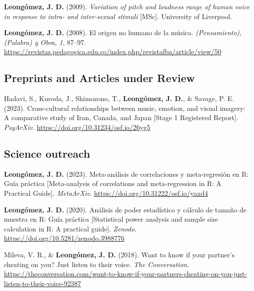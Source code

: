 \documentclass[11pt,a4paper,]{awesome-cv}
\begin{document}
\textbf{Leongómez, J. D.} (2009). \emph{Variation of pitch and loudness
range of human voice in response to intra- and inter-sexual stimuli}
{[}MSc{]}. University of Liverpool.

\textbf{Leongómez, J. D.} (2008). El origen no humano de la música.
\emph{(Pensamiento), (Palabra) y Obra, 1}, 87--97.
\url{https://revistas.pedagogica.edu.co/index.php/revistafba/article/view/50}

\endgroup

\hypertarget{section-1}{%
\subsection{\texorpdfstring{\textbf{Preprints and Articles under Review}}{}}\label{section-1}}

\begingroup
\footnotesize
\setlength{\parindent}{-0.5in}
\setlength{\leftskip}{0.5in}

Hadavi, S., Kuroda, J., Shimozono, T., \textbf{Leongómez, J. D.}, \&
Savage, P. E. (2023). Cross-cultural relationships between music,
emotion, and visual imagery: A comparative study of Iran, Canada, and
Japan {[}Stage 1 Registered Report{]}. \emph{PsyArXiv}.
\url{https://doi.org/10.31234/osf.io/26yg5}

\endgroup

\hypertarget{section-2}{%
\subsection{\texorpdfstring{\textbf{Science outreach}}{}}\label{section-2}}

\begingroup
\footnotesize
\setlength{\parindent}{-0.5in}
\setlength{\leftskip}{0.5in}

\textbf{Leongómez, J. D.} (2023). Meta-análisis de correlaciones y
meta-regresión en R: Guía práctica {[}Meta-analysis of correlations and
meta-regression in R: A Practical Guide{]}. \emph{MetaArXiv}.
\url{https://doi.org/10.31222/osf.io/yaxd4}

\textbf{Leongómez, J. D.} (2020). Análisis de poder estadístico y
cálculo de tamaño de muestra en R: Guía práctica {[}Statistical power
analysis and sample size calculation in R: A practical guide{]}.
\emph{Zenodo}. \url{https://doi.org/10.5281/zenodo.3988776}

Mileva, V. R., \& \textbf{Leongómez, J. D.} (2018). Want to know if your
partner's cheating on you? Just listen to their voice. \emph{The
Conversation}.
\url{https://theconversation.com/want-to-know-if-your-partners-cheating-on-you-just-listen-to-their-voice-92387}
\end{document}
